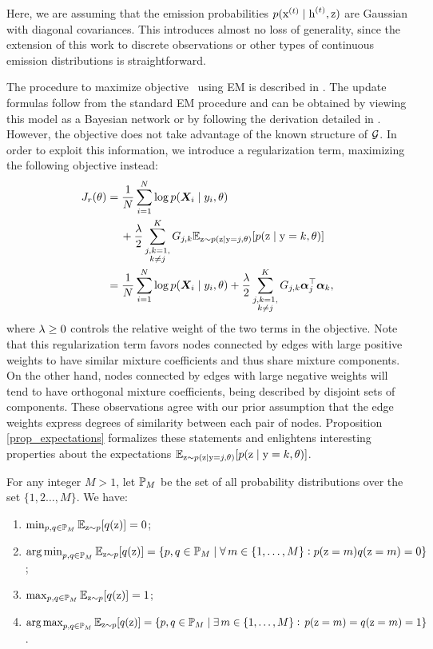 Here, we are assuming that the emission probabilities $p({\textnormal{x}}^{(t)}\mid{\textnormal{h}}^{(t)},{\textnormal{z}})$ are Gaussian with diagonal covariances. This introduces almost no loss of generality, since the extension of this work to discrete observations or other types of continuous emission distributions is straightforward.

The procedure to maximize objective~ using EM is described in . The update formulas follow from the standard EM procedure and can be obtained by viewing this model as a Bayesian network or by following the derivation detailed in . However, the objective  does not take advantage of the known structure of ${\mathcal{G}}$. In order to exploit this information, we introduce a regularization term, maximizing the following objective instead:
\begin{align}
\label{objective}
J_r(\theta) &= \frac{1}{N}\sum_{i=1}^N \log p({\bm{X}}_i \mid y_i, \theta) \nonumber\\ 
&\mathbin{\hphantom{=}}{}+ \frac{\lambda}{2} \sum_{\substack{j,k=1,\\k\neq j}}^{K} {G}_{j,k} \mathbb{E}_{{\textnormal{z}} \sim p({\textnormal{z}} \mid {\textnormal{y}}=j, \theta)} [ p({\textnormal{z}} \mid {\textnormal{y}}=k, \theta) ] \nonumber\\
&= \frac{1}{N}\sum_{i=1}^N \log p({\bm{X}}_i \mid y_i, \theta) + \frac{\lambda}{2} \sum_{\substack{j,k=1,\\k\neq j}}^{K} {G}_{j,k} {\bm{\alpha}}_j^\top {\bm{\alpha}}_k,
\end{align}
where $\lambda \geq 0$ controls the relative weight of the two terms in the objective. Note that this regularization term favors nodes connected by edges with large positive weights to have similar mixture coefficients and thus share mixture components. On the other hand, nodes connected by edges with large negative weights will tend to have orthogonal mixture coefficients, being described by disjoint sets of components. These observations agree with our prior assumption that the edge weights express degrees of similarity between each pair of nodes. Proposition \ref{prop_expectations} formalizes these statements and enlightens interesting properties about the expectations $\mathbb{E}_{{\textnormal{z}} \sim p({\textnormal{z}} \mid {\textnormal{y}}=j, \theta)} [ p({\textnormal{z}} \mid {\textnormal{y}}=k, \theta)]$.
\begin{proposition}
	\label{prop_expectations}
	For any integer $M>1$, let ${\mathbb{P}}_M$ be the set of all probability distributions over the set $\{1,2\dots,M\}$. We have:
	\begin{enumerate}
		\item $\min_{p,q \in {\mathbb{P}}_M} \mathbb{E}_{{\textnormal{z}}\sim p} [ q({\textnormal{z}}) ] = 0$; \label{prop_min}
		\item $\operatorname*{arg\,min}_{p,q \in {\mathbb{P}}_M} \mathbb{E}_{{\textnormal{z}}\sim p} [ q({\textnormal{z}}) ] = \{p,q \in {\mathbb{P}}_M \mid \forall \, m \in \{1,\dots,M\}: p({\textnormal{z}} = m)q({\textnormal{z}} = m)=0\}$; \label{prop_argmin}
		\item $\max_{p,q \in {\mathbb{P}}_M} \mathbb{E}_{{\textnormal{z}}\sim p} [ q({\textnormal{z}}) ] = 1$; \label{prop_max}
		\item $\operatorname*{arg\,max}_{p,q \in {\mathbb{P}}_M} \mathbb{E}_{{\textnormal{z}}\sim p} [ q({\textnormal{z}}) ] = \{p,q \in {\mathbb{P}}_M \mid \exists \, m \in \{1,\dots,M\} : \, p({\textnormal{z}} = m)=q({\textnormal{z}} = m)=1\}$ \label{prop_argmax}.
	\end{enumerate}
\end{proposition}
